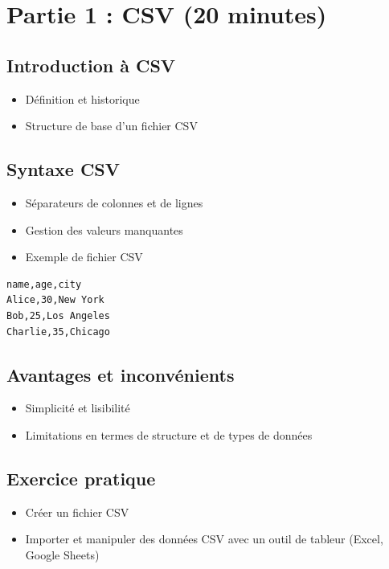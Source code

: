 \documentclass{article}
\begin{document}
\section{Partie 1 : CSV (20 minutes)}
\subsection{Introduction à CSV}
\begin{itemize}
    \item Définition et historique
    \item Structure de base d'un fichier CSV
\end{itemize}

\subsection{Syntaxe CSV}
\begin{itemize}
    \item Séparateurs de colonnes et de lignes
    \item Gestion des valeurs manquantes
    \item Exemple de fichier CSV
\end{itemize}

\begin{lstlisting}[language=CSV, caption=Exemple de fichier CSV]
name,age,city
Alice,30,New York
Bob,25,Los Angeles
Charlie,35,Chicago
\end{lstlisting}

\subsection{Avantages et inconvénients}
\begin{itemize}
    \item Simplicité et lisibilité
    \item Limitations en termes de structure et de types de données
\end{itemize}

\subsection{Exercice pratique}
\begin{itemize}
    \item Créer un fichier CSV
    \item Importer et manipuler des données CSV avec un outil de tableur (Excel, Google Sheets)
\end{itemize}
\end{document}
